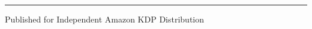 \begin{titlepage}
\centering
\vspace*{0.8in}

{\Large\scshape \BookSeries}\par
\vspace{1.2cm}

{\Huge\bfseries\color{MidnightBlue} \BookTitle}\par
\vspace{0.6cm}
{\Large\itshape \BookSubtitle}\par

\vspace{2cm}

\rule{0.6\textwidth}{1.2pt}\par
\vspace{1.5cm}

{\Large\bfseries \BookAuthor}\par
\vspace{0.4cm}
{\large \Edition}\par

\vfill

{\small Published for Independent Amazon KDP Distribution}\par
\vspace*{0.5in}
\end{titlepage}
